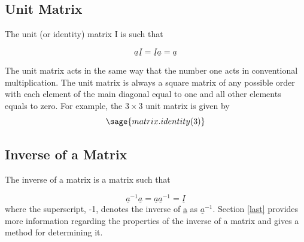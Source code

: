 \documentclass[12pt]{report}
\begin{document}
\subsection{Unit Matrix}

The unit (or identity) matrix I is such that

\begin{equation}
	\underline{a}\underline{I}=\underline{I}\underline{a}=\underline{a}
\end{equation}

The unit matrix acts in the same way that the number one acts in
conventional multiplication. The unit matrix is always a square matrix
of any possible order with each element of the main diagonal equal to
one and all other elements equals to zero. For example, the $3 \times 3$
unit matrix is given by
\begin{equation}
	\sage{matrix.identity(3)}
\end{equation}


\subsection{Inverse of a Matrix}

The inverse of a matrix is a matrix such that

\begin{equation}
	\underline{a}^{-1}\underline{a}=\underline{a}\underline{a}^{-1}=\underline{I}
\end{equation}
where the superscript, -1, denotes the inverse of \underline{a} 
as $\underline{a}^{-1}$. Section \ref{last} provides more 
information regarding the properties of the inverse of a 
matrix and gives a method for determining it.

\end{document}
